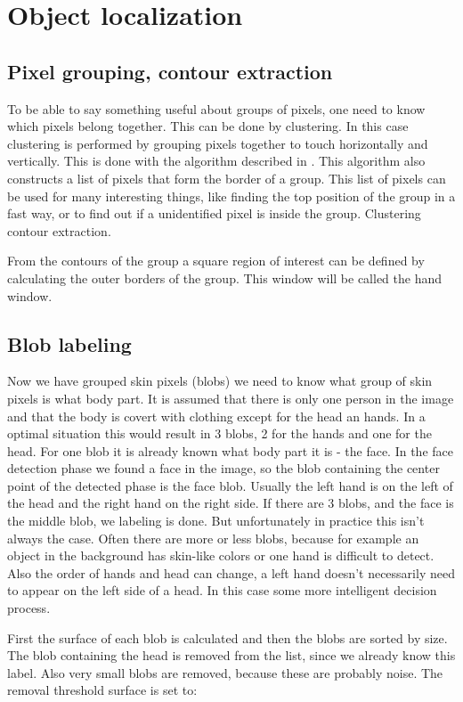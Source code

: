 \section{Object localization}

\subsection*{Pixel grouping, contour extraction}
To be able to say something useful about groups of pixels, one need to know which pixels belong together. This can be done by clustering. In this case clustering is performed by grouping pixels together to touch horizontally and vertically. This is done with the algorithm described in \cite{Suzuki1985}. This algorithm also constructs a list of pixels that form the border of a group. This list of pixels can be used for many interesting things, like finding the top position of the group in a fast way, or to find out if a unidentified pixel is inside the group. Clustering contour extraction\cite{Suzuki1985}.

From the contours of the group a square region of interest can be defined by calculating the outer borders of the group. This window will be called the hand window.

\subsection*{Blob labeling}
Now we have grouped skin pixels (blobs) we need to know what group of skin pixels is what body part. It is assumed that there is only one person in the image and that the body is covert with clothing except for the head an hands. In a optimal situation this would result in 3 blobs, 2 for the hands and one for the head. For one blob it is already known what body part it is - the face. In the face detection phase we found a face in the image, so the blob containing the center point of the detected phase is the face blob. Usually the left hand is on the left of the head and the right hand on the right side. If there are 3 blobs, and the face is the middle blob, we labeling is done. But unfortunately in practice this isn't always the case. Often there are more or less blobs, because for example an object in the background has skin-like colors or one hand is difficult to detect. Also the order of hands and head can change, a left hand doesn't necessarily need to appear on the left side of a head. In this case some more intelligent decision process. 

First the surface of each blob is calculated and then the blobs are sorted by size. The blob containing the head is removed from the list, since we already know this label. Also very small blobs are removed, because these are probably noise. The removal threshold surface is set to:

